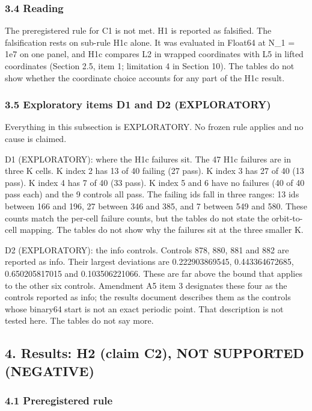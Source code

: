 \documentclass[
  11pt,
]{article}
\begin{document}
\subsubsection{3.4 Reading}\label{reading}

The preregistered rule for C1 is not met. H1 is reported as falsified.
The falsification rests on sub-rule H1c alone. It was evaluated in
Float64 at N\_1 = 1e7 on one panel, and H1c compares L2 in wrapped
coordinates with L5 in lifted coordinates (Section 2.5, item 1;
limitation 4 in Section 10). The tables do not show whether the
coordinate choice accounts for any part of the H1c result.

\subsubsection{3.5 Exploratory items D1 and D2
(EXPLORATORY)}\label{exploratory-items-d1-and-d2-exploratory}

Everything in this subsection is EXPLORATORY. No frozen rule applies and
no cause is claimed.

D1 (EXPLORATORY): where the H1c failures sit. The 47 H1c failures are in
three K cells. K index 2 has 13 of 40 failing (27 pass). K index 3 has
27 of 40 (13 pass). K index 4 has 7 of 40 (33 pass). K index 5 and 6
have no failures (40 of 40 pass each) and the 9 controls all pass. The
failing ids fall in three ranges: 13 ids between 166 and 196, 27 between
346 and 385, and 7 between 549 and 580. These counts match the per-cell
failure counts, but the tables do not state the orbit-to-cell mapping.
The tables do not show why the failures sit at the three smaller K.

D2 (EXPLORATORY): the info controls. Controls 878, 880, 881 and 882 are
reported as info. Their largest deviations are 0.222903869545,
0.443364672685, 0.650205817015 and 0.103506221066. These are far above
the bound that applies to the other six controls. Amendment A5 item 3
designates these four as the controls reported as info; the results
document describes them as the controls whose binary64 start is not an
exact periodic point. That description is not tested here. The tables do
not say more.

\subsection{4. Results: H2 (claim C2), NOT SUPPORTED
(NEGATIVE)}\label{results-h2-claim-c2-not-supported-negative}

\subsubsection{4.1 Preregistered rule}\label{preregistered-rule-1}
\end{document}
